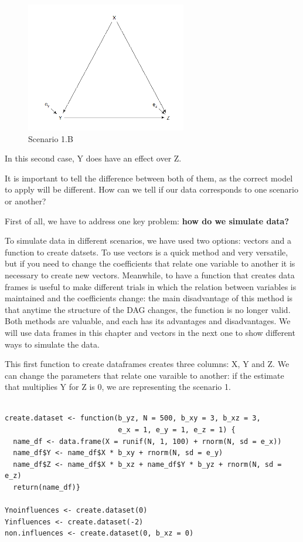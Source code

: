 \documentclass{article}
\begin{document}
\begin{figure}[h]
\caption{Scenario 1.B}
\includegraphics[width=7cm]{scenario2.DAG.png}
\centering
\end{figure}

In this second case, Y does have an effect over Z.\par
It is important to tell the difference between both of them, as the correct model to apply will be different. How can we tell if our data corresponds to one scenario or another?\par
First of all, we have to address one key problem: \textbf{how do we simulate data?}\par
To simulate data in different scenarios, we have used two options: vectors and a function to create datsets. To use vectors is a quick method and very versatile, but if you need to change the coefficients that relate one variable to another it is necessary to create new vectors. Meanwhile, to have a function that creates data frames is useful to make different trials in which the relation between variables is maintained and the coefficients change: the main disadvantage of this method is that anytime the structure of the DAG changes, the function is no longer valid. Both methods are valuable, and each has its advantages and disadvantages. We will use data frames in this chapter and vectors in the next one to show different ways to simulate the data.\par
This first function to create dataframes creates three columns: X, Y and Z. We can change the parameters that relate one varaible to another: if the estimate that multiplies Y for Z is 0, we are representing the scenario 1. \par

\begin{lstlisting}

create.dataset <- function(b_yz, N = 500, b_xy = 3, b_xz = 3,
                           e_x = 1, e_y = 1, e_z = 1) {
  name_df <- data.frame(X = runif(N, 1, 100) + rnorm(N, sd = e_x))
  name_df$Y <- name_df$X * b_xy + rnorm(N, sd = e_y)
  name_df$Z <- name_df$X * b_xz + name_df$Y * b_yz + rnorm(N, sd = e_z)
  return(name_df)}

Ynoinfluences <- create.dataset(0)
Yinfluences <- create.dataset(-2)
non.influences <- create.dataset(0, b_xz = 0)

\end{lstlisting}
\end{document}
